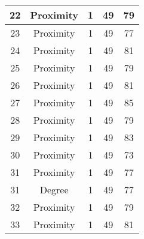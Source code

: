 \documentclass[results.tex]{subfiles}
\begin{document}
\begin{center}
\begin{tabular}{| c || c | c | c | c |}
            \hline
            22                      & Proximity                    & 1                      & 49                      & 79                   \\
            \hline
            23                      & Proximity                    & 1                      & 49                      & 77                   \\
            \hline
            24                      & Proximity                    & 1                      & 49                      & 81                   \\
            \hline
            25                      & Proximity                    & 1                      & 49                      & 79                   \\
            \hline
            26                      & Proximity                    & 1                      & 49                      & 81                   \\
            \hline
            27                      & Proximity                    & 1                      & 49                      & 85                   \\
            \hline
            28                      & Proximity                    & 1                      & 49                      & 79                   \\
            \hline
            29                      & Proximity                    & 1                      & 49                      & 83                   \\
            \hline
            30                      & Proximity                    & 1                      & 49                      & 73                   \\
            \hline
            31                      & Proximity                    & 1                      & 49                      & 77                   \\
            \hline
            31                      & Degree                       & 1                      & 49                      & 77                   \\
            \hline
            32                      & Proximity                    & 1                      & 49                      & 79                   \\
            \hline
            33                      & Proximity                    & 1                      & 49                      & 81                   \\

\end{tabular}
\end{center}
\end{document}
